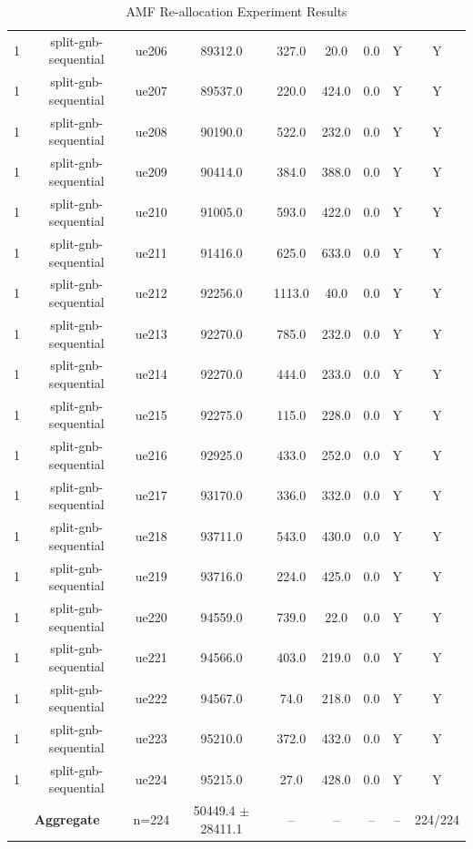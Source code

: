 \begin{table}[ht]
\begin{tabular}{|c|c|c|c|c|c|c|c|c|}
1 & split-gnb-sequential & ue206 & 89312.0 & 327.0 & 20.0 & 0.0 & Y & Y \\
1 & split-gnb-sequential & ue207 & 89537.0 & 220.0 & 424.0 & 0.0 & Y & Y \\
1 & split-gnb-sequential & ue208 & 90190.0 & 522.0 & 232.0 & 0.0 & Y & Y \\
1 & split-gnb-sequential & ue209 & 90414.0 & 384.0 & 388.0 & 0.0 & Y & Y \\
1 & split-gnb-sequential & ue210 & 91005.0 & 593.0 & 422.0 & 0.0 & Y & Y \\
1 & split-gnb-sequential & ue211 & 91416.0 & 625.0 & 633.0 & 0.0 & Y & Y \\
1 & split-gnb-sequential & ue212 & 92256.0 & 1113.0 & 40.0 & 0.0 & Y & Y \\
1 & split-gnb-sequential & ue213 & 92270.0 & 785.0 & 232.0 & 0.0 & Y & Y \\
1 & split-gnb-sequential & ue214 & 92270.0 & 444.0 & 233.0 & 0.0 & Y & Y \\
1 & split-gnb-sequential & ue215 & 92275.0 & 115.0 & 228.0 & 0.0 & Y & Y \\
1 & split-gnb-sequential & ue216 & 92925.0 & 433.0 & 252.0 & 0.0 & Y & Y \\
1 & split-gnb-sequential & ue217 & 93170.0 & 336.0 & 332.0 & 0.0 & Y & Y \\
1 & split-gnb-sequential & ue218 & 93711.0 & 543.0 & 430.0 & 0.0 & Y & Y \\
1 & split-gnb-sequential & ue219 & 93716.0 & 224.0 & 425.0 & 0.0 & Y & Y \\
1 & split-gnb-sequential & ue220 & 94559.0 & 739.0 & 22.0 & 0.0 & Y & Y \\
1 & split-gnb-sequential & ue221 & 94566.0 & 403.0 & 219.0 & 0.0 & Y & Y \\
1 & split-gnb-sequential & ue222 & 94567.0 & 74.0 & 218.0 & 0.0 & Y & Y \\
1 & split-gnb-sequential & ue223 & 95210.0 & 372.0 & 432.0 & 0.0 & Y & Y \\
1 & split-gnb-sequential & ue224 & 95215.0 & 27.0 & 428.0 & 0.0 & Y & Y \\
\multicolumn{2}{|c|}{\textbf{Aggregate}} & n=224 & 50449.4 $\pm$ 28411.1 & -- & -- & -- & -- & 224/224 \\
\hline
\end{tabular}
\caption{AMF Re-allocation Experiment Results}
\label{tab:amf_realloc}
\end{table}
